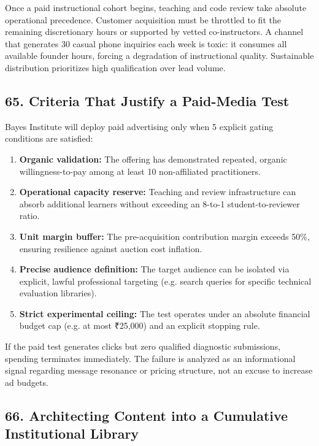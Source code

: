 Once a paid instructional cohort begins, teaching and code review take absolute operational precedence. Customer acquisition must be throttled to fit the remaining discretionary hours or supported by vetted co-instructors. A channel that generates 30 casual phone inquiries each week is toxic: it consumes all available founder hours, forcing a degradation of instructional quality. Sustainable distribution prioritizes high qualification over lead volume.

\subsection*{65. Criteria That Justify a Paid-Media Test}

Bayes Institute will deploy paid advertising only when 5 explicit gating conditions are satisfied:
\begin{enumerate}[leftmargin=*,itemsep=1pt]
  \item \textbf{Organic validation:} The offering has demonstrated repeated, organic willingness-to-pay among at least 10 non-affiliated practitioners.
  \item \textbf{Operational capacity reserve:} Teaching and review infrastructure can absorb additional learners without exceeding an 8-to-1 student-to-reviewer ratio.
  \item \textbf{Unit margin buffer:} The pre-acquisition contribution margin exceeds 50\%, ensuring resilience against auction cost inflation.
  \item \textbf{Precise audience definition:} The target audience can be isolated via explicit, lawful professional targeting (e.g. search queries for specific technical evaluation libraries).
  \item \textbf{Strict experimental ceiling:} The test operates under an absolute financial budget cap (e.g. at most ₹25,000) and an explicit stopping rule.
\end{enumerate}

If the paid test generates clicks but zero qualified diagnostic submissions, spending terminates immediately. The failure is analyzed as an informational signal regarding message resonance or pricing structure, not an excuse to increase ad budgets.

\subsection*{66. Architecting Content into a Cumulative Institutional Library}

